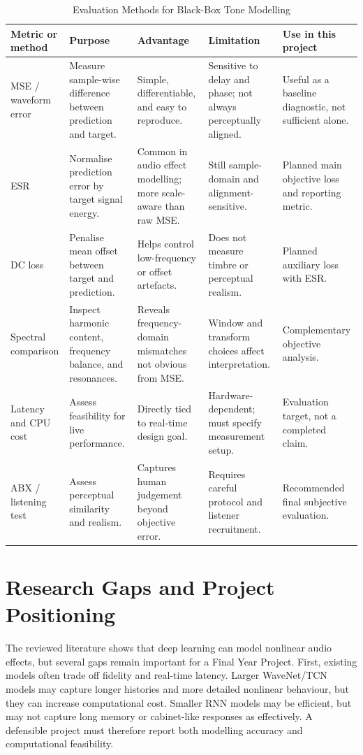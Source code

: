 \documentclass[conference]{IEEEtran}
\begin{document}
\begin{table}[t]
\caption{Evaluation Methods for Black-Box Tone Modelling}
\label{tab:evaluation}
\centering
\footnotesize
\setlength{\tabcolsep}{3pt}
\begin{tabular}{@{}L{0.15\textwidth} L{0.19\textwidth} L{0.19\textwidth} L{0.19\textwidth} L{0.19\textwidth}@{}}
\toprule
\textbf{Metric or method} & \textbf{Purpose} & \textbf{Advantage} & \textbf{Limitation} & \textbf{Use in this project} \\
\midrule
MSE / waveform error & Measure sample-wise difference between prediction and target. & Simple, differentiable, and easy to reproduce. & Sensitive to delay and phase; not always perceptually aligned. & Useful as a baseline diagnostic, not sufficient alone. \\
\addlinespace
ESR & Normalise prediction error by target signal energy. & Common in audio effect modelling; more scale-aware than raw MSE. & Still sample-domain and alignment-sensitive. & Planned main objective loss and reporting metric. \\
\addlinespace
DC loss & Penalise mean offset between target and prediction. & Helps control low-frequency or offset artefacts. & Does not measure timbre or perceptual realism. & Planned auxiliary loss with ESR. \\
\addlinespace
Spectral comparison & Inspect harmonic content, frequency balance, and resonances. & Reveals frequency-domain mismatches not obvious from MSE. & Window and transform choices affect interpretation. & Complementary objective analysis. \\
\addlinespace
Latency and CPU cost & Assess feasibility for live performance. & Directly tied to real-time design goal. & Hardware-dependent; must specify measurement setup. & Evaluation target, not a completed claim. \\
\addlinespace
ABX / listening test & Assess perceptual similarity and realism. & Captures human judgement beyond objective error. & Requires careful protocol and listener recruitment. & Recommended final subjective evaluation. \\
\bottomrule
\end{tabular}
\end{table}

\section{Research Gaps and Project Positioning}

The reviewed literature shows that deep learning can model nonlinear audio effects, but several gaps remain important for a Final Year Project. First, existing models often trade off fidelity and real-time latency. Larger WaveNet/TCN models may capture longer histories and more detailed nonlinear behaviour, but they can increase computational cost. Smaller RNN models may be efficient, but may not capture long memory or cabinet-like responses as effectively. A defensible project must therefore report both modelling accuracy and computational feasibility.
\end{document}
